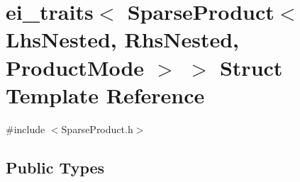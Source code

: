 \hypertarget{structei__traits_3_01_sparse_product_3_01_lhs_nested_00_01_rhs_nested_00_01_product_mode_01_4_01_4}{\section{ei\-\_\-traits$<$ Sparse\-Product$<$ Lhs\-Nested, Rhs\-Nested, Product\-Mode $>$ $>$ Struct Template Reference}
\label{structei__traits_3_01_sparse_product_3_01_lhs_nested_00_01_rhs_nested_00_01_product_mode_01_4_01_4}
}


{\ttfamily \#include $<$Sparse\-Product.\-h$>$}

\subsection*{Public Types}
